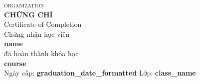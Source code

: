 \documentclass[a4paper,landscape,12pt]{article}
\begin{document}
\begin{center}
{\small\color{muted}\textsc{ {{organization}} }}\\[6pt]
{\Large\color{gold}\textbf{CHỨNG CHỈ}}\\[4pt]
{\small\color{muted}Certificate of Completion}\\[18pt]

{\large Chứng nhận học viên}\\[10pt]
{\LARGE\bfseries {{name}} }\\[12pt]
{\large đã hoàn thành khóa học}\\[8pt]
{\large\bfseries {{course}} }\\[16pt]

{\normalsize
Ngày cấp: \textbf{ {{graduation_date_formatted}} }
\hspace{2em} Lớp: \textbf{ {{class_name}} }
}\\[24pt]

\end{center}
\end{document}
